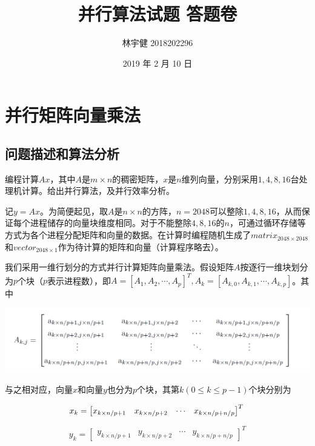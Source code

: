 \documentclass{article}
\title{并行算法试题 答题卷}
\author{林宇健   2018202296}
\date{2019 年 2 月 10 日}
\begin{document}
\maketitle

\section{并行矩阵向量乘法}
\subsection{问题描述和算法分析}
编程计算$Ax$，其中$A$是$m\times n$的稠密矩阵，$x$是$n$维列向量，分别采用$1,4,8,16$台处理机计算。给出并行算法，及并行效率分析。

记$y=Ax$。为简便起见，取$A$是$n\times n$的方阵，$n = 2048$可以整除$1,4,8,16$，从而保证每个进程储存的向量块维度相同。对于不能整除$4,8,16$的$n$，可通过循环存储等方式为各个进程分配矩阵和向量的数据。在计算时编程随机生成了$matrix_{2048\times 2048}$和$vector_{2048 \times 1}$作为待计算的矩阵和向量（计算程序略去）。

我们采用一维行划分的方式并行计算矩阵向量乘法。假设矩阵$A$按逐行一维块划分为$p$个块（$p$表示进程数），即$A = [A_{1}, A_{2}, \cdots, A_{p}]^{T},A_{k} = [A_{k,0},A_{k,1},\cdots,A_{k,p}]$。其中

\begin{center}	
	\includegraphics[width=1.0\linewidth]{pic01.png}
\end{center}

与之相对应，向量$x$和向量$y$也分为$p$个块，其第$k(0\leq k\leq p-1)$个块分别为

$$x_{k} = \left[\begin{matrix}
  x_{k\times n/p+1} & x_{k\times n/p+2} & \cdots & x_{k\times n/p+n/p}
\end{matrix}\right]^{T}\\$$

$$y_{k} = \left[\begin{matrix}
y_{k\times n/p+1} & y_{k\times n/p+2} & \cdots & y_{k\times n/p+n/p}
\end{matrix}\right]^{T}$$
\end{document}
